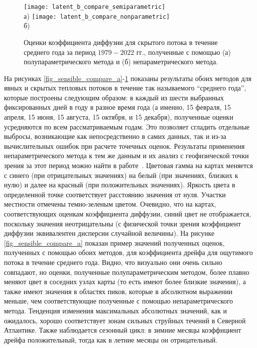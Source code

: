 \begin{figure}[!h]
	\centering
	\texttt{[image: latent\_b\_compare\_semiparametric]}\\
	а)
	\texttt{[image: latent\_b\_compare\_nonparametric]}\\
	б)
	\caption{Оценки коэффициента диффузии для скрытого потока в течение среднего года за период $1979-2022$ гг., полученные с помощью (а) полупараметрического метода и (б) непараметрического метода.} 
	\label{fig_latent_compare_b}
\end{figure}

На рисунках \ref{fig_sensible_compare_a}-\ref{fig_latent_compare_b} показаны результаты обоих методов для явных и скрытых тепловых потоков в течение так называемого “среднего года”, которые построены следующим образом: в каждый из шести выбранных фиксированных дней в году в разное время года (а именно, 15 февраля, 15 апреля, 15 июня, 15 августа, 15 октября, и 15 декабря), полученные оценки усредняются по всем рассматриваемым годам. Это позволяет сгладить отдельные выбросы, возникающие как непосредственно в самих данных, так и из-за вычислительных ошибок при расчете точечных оценок. Результаты применения непараметрического метода к тем же данным и их анализ с геофизической точки зрения за этот период можно найти в работе~\cite{Gorshenin2023}.
Цветовая гамма на картах меняется с синего (при отрицательных значениях) на белый (при значениях, близких к нулю) и далее на красный (при положительных значениях). Яркость цвета в определенной точке соответствует расстоянию значения от нуля. Участки местности отмечены темно-зеленым цветом. Очевидно, что на картах, соответствующих оценкам коэффициента диффузии, синий цвет не отображается, поскольку значения неотрицательны (с физической точки зрения коэффициент диффузии эквивалентен дисперсии случайной величины).
На рисунке \ref{fig_sensible_compare_a} показан пример значений полученных оценок, полученных с помощью обоих методов, для коэффициента дрейфа для ощутимого потока в течение среднего года. Видно, что визуально они очень сильно совпадают, но оценки, полученные полупараметрическим методом, более плавно меняют цвет в соседних узлах карты (то есть имеют более близкие значения), а также имеют значения в областях пиков, которые в абсолютном выражении меньше, чем соответствующие полученные с помощью непараметрического метода. Тенденция изменения максимальных абсолютных значений, как и ожидалось, хорошо соответствует зонам сильных струйных течений в Северной Атлантике. Также наблюдается сезонный цикл: в зимние месяцы коэффициент дрейфа положительный, тогда как в летние месяцы он отрицательный.

